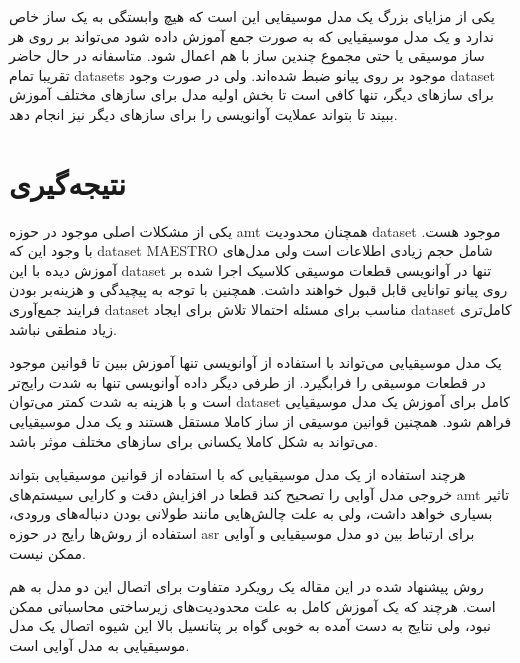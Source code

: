 یکی از مزایای بزرگ یک مدل موسیقایی این است که هیچ وابستگی به یک ساز خاص ندارد و
یک مدل موسیقیایی که به صورت جمع آموزش داده شود می‌تواند بر روی هر ساز موسیقی یا
حتی مجموع چندین ساز با هم اعمال شود. متاسفانه در حال حاضر تقریبا تمام
\glspl{dataset} موجود بر روی پیانو ضبط شده‌اند. ولی در صورت وجود \gls{dataset}
برای سازهای دیگر، تنها کافی است تا بخش اولیه مدل برای سازهای مختلف آموزش ببیند
تا بتواند عملایت آوانویسی را برای سازهای دیگر نیز انجام دهد.

\section{نتیجه‌گیری}
یکی از مشکلات اصلی موجود در حوزه \gls{amt} همچنان محدودیت \gls{dataset} موجود
هست. با وجود این که \gls{dataset} MAESTRO شامل حجم زیادی اطلاعات است ولی
مدل‌های آموزش دیده با این \gls{dataset} تنها در آوانویسی قطعات موسیقی کلاسیک
اجرا شده بر روی پیانو توانایی قابل قبول خواهند داشت. همچنین با توجه به پیچیدگی و
هزینه‌بر بودن فرایند جمع‌آوری \gls{dataset} مناسب برای مسئله احتمالا تلاش برای
ایجاد \gls{dataset} کامل‌تری زیاد منطقی نباشد.

یک مدل موسیقیایی می‌تواند با استفاده از آوانویسی تنها آموزش ببین تا قوانین موجود
در قطعات موسیقی را فرابگیرد. از طرفی دیگر داده آوانویسی تنها به شدت رایج‌تر است
و با هزینه‌ به شدت کمتر می‌توان \gls{dataset} کامل برای آموزش یک مدل موسیقیایی
فراهم شود. همچنین قوانین موسیقی از ساز کاملا مستقل هستند و یک مدل موسیقیایی
می‌تواند به شکل کاملا یکسانی برای سازهای مختلف موثر باشد.

هرچند استفاده از یک مدل موسیقیایی که با استفاده از قوانین موسیقیایی بتواند خروجی
مدل آوایی را تصحیح کند قطعا در افزایش دقت و کارایی سیستم‌های \gls{amt} تاثیر
بسیاری خواهد داشت، ولی به علت چالش‌هایی مانند طولانی بودن دنباله‌های ورودی،
استفاده از روش‌ها رایج در حوزه \gls{asr} برای ارتباط بین دو مدل موسیقیایی و
آوایی ممکن نیست.

روش پیشنهاد شده در این مقاله یک رویکرد متفاوت برای اتصال این دو مدل به هم است.
هرچند که یک آموزش کامل به علت محدودیت‌های زیرساختی محاسباتی ممکن نبود، ولی نتایج
به دست آمده به خوبی گواه بر پتانسیل بالا این شیوه اتصال یک مدل موسیقیایی به مدل
آوایی است.